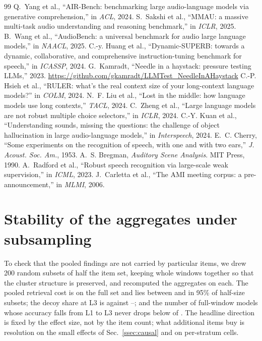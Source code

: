 \documentclass{article}
\begin{document}
\begin{thebibliography}{99}\footnotesize\itemsep0pt
 Q.~Yang et al., ``AIR-Bench: benchmarking large audio-language models via generative comprehension,'' in \emph{ACL}, 2024.
 S.~Sakshi et al., ``MMAU: a massive multi-task audio understanding and reasoning benchmark,'' in \emph{ICLR}, 2025.
 B.~Wang et al., ``AudioBench: a universal benchmark for audio large language models,'' in \emph{NAACL}, 2025.
 C.-y. Huang et al., ``Dynamic-SUPERB: towards a dynamic, collaborative, and comprehensive instruction-tuning benchmark for speech,'' in \emph{ICASSP}, 2024.
 G.~Kamradt, ``Needle in a haystack: pressure testing LLMs,'' 2023. \url{https://github.com/gkamradt/LLMTest_NeedleInAHaystack}
 C.-P. Hsieh et al., ``RULER: what's the real context size of your long-context language models?'' in \emph{COLM}, 2024.
 N.~F. Liu et al., ``Lost in the middle: how language models use long contexts,'' \emph{TACL}, 2024.
 C.~Zheng et al., ``Large language models are not robust multiple choice selectors,'' in \emph{ICLR}, 2024.
 C.-Y. Kuan et al., ``Understanding sounds, missing the questions: the challenge of object hallucination in large audio-language models,'' in \emph{Interspeech}, 2024.
 E.~C. Cherry, ``Some experiments on the recognition of speech, with one and with two ears,'' \emph{J. Acoust. Soc. Am.}, 1953.
 A.~S. Bregman, \emph{Auditory Scene Analysis}. MIT Press, 1990.
 A.~Radford et al., ``Robust speech recognition via large-scale weak supervision,'' in \emph{ICML}, 2023.
 J.~Carletta et al., ``The AMI meeting corpus: a pre-announcement,'' in \emph{MLMI}, 2006.
\end{thebibliography}

\appendix
\section{Stability of the aggregates under subsampling}
\label{app:stability}
To check that the pooled findings are not carried by particular items, we
drew 200 random subsets of half the item set, keeping whole windows together
so that the cluster structure is preserved, and recomputed the aggregates on
each. The pooled retrieval cost is \subDeltaFull{} on the full set and lies
between \subDeltaLo{} and \subDeltaHi{} in 95\% of half-size subsets; the
decoy share at L3 is \subSalFull{} against \subSalLo{}--\subSalHi{}; and the
number of full-window models whose accuracy falls from L1 to L3 never drops
below \subSignMin{} of \Nfullcov{}. The headline direction is fixed by the
effect size, not by the item count; what additional items buy is resolution
on the small effects of Sec.~\ref{ssec:causal} and on per-stratum cells.
\end{document}
